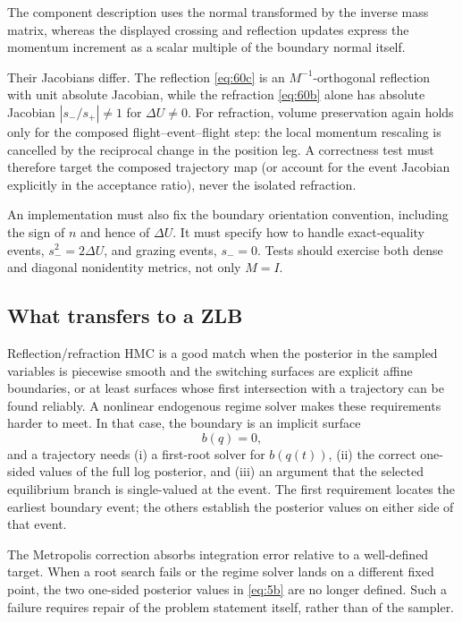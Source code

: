 \documentclass[11pt]{article}
\begin{document}
The component description uses the normal transformed by the inverse mass
matrix, whereas the displayed crossing and reflection updates express the
momentum increment as a scalar multiple of the boundary normal itself.

Their Jacobians differ. The reflection \eqref{eq:60c} is an
$M^{-1}$-orthogonal reflection with unit absolute Jacobian, while the
refraction \eqref{eq:60b} alone has absolute Jacobian
$|s_-/s_+|\neq1$ for $\Delta U\neq0$. For refraction, volume preservation again
holds only for the composed flight--event--flight step: the local momentum
rescaling is cancelled by the reciprocal change in the position leg. A
correctness test must therefore target the composed trajectory map (or
account for the event Jacobian explicitly in the acceptance ratio), never
the isolated refraction.

An implementation must also fix the boundary orientation convention,
including the sign of $n$ and hence of $\Delta U$. It must specify
how to handle exact-equality events, $s_-^2=2\Delta U$, and grazing events,
$s_-=0$. Tests should exercise both dense and diagonal nonidentity
metrics, not only $M=I$.

\subsection{What transfers to a ZLB}\label{sec:event-zlb}

Reflection/refraction HMC is a good match when the posterior in the sampled
variables is piecewise smooth and the switching surfaces are explicit affine
boundaries, or at least surfaces whose first intersection with a trajectory
can be found reliably. A nonlinear endogenous regime solver makes these
requirements harder to meet. In that case, the boundary is an implicit surface
\begin{equation}\label{eq:61}
 b(q)=0,
\end{equation}
and a trajectory needs (i) a first-root solver for $b(q(t))$, (ii) the correct
one-sided values of the full log posterior, and (iii) an argument that the
selected equilibrium branch is single-valued at the event. The first
requirement locates the earliest boundary event; the others establish the
posterior values on either side of that event.

The Metropolis correction absorbs integration error relative to a well-defined
target. When a root search fails or the regime solver lands on a different
fixed point, the two one-sided posterior values in \eqref{eq:5b} are no longer
defined. Such a failure requires repair of the problem statement itself,
rather than of the sampler.
\end{document}
